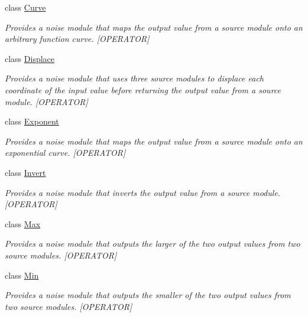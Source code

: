 \begin{DoxyCompactItemize}
class \hyperlink{class_lib_noise_1_1_operator_1_1_curve}{Curve}
\begin{DoxyCompactList}\small\item\em Provides a noise module that maps the output value from a source module onto an arbitrary function curve. \mbox{[}O\+P\+E\+R\+A\+T\+OR\mbox{]} \end{DoxyCompactList}\item 
class \hyperlink{class_lib_noise_1_1_operator_1_1_displace}{Displace}
\begin{DoxyCompactList}\small\item\em Provides a noise module that uses three source modules to displace each coordinate of the input value before returning the output value from a source module. \mbox{[}O\+P\+E\+R\+A\+T\+OR\mbox{]} \end{DoxyCompactList}\item 
class \hyperlink{class_lib_noise_1_1_operator_1_1_exponent}{Exponent}
\begin{DoxyCompactList}\small\item\em Provides a noise module that maps the output value from a source module onto an exponential curve. \mbox{[}O\+P\+E\+R\+A\+T\+OR\mbox{]} \end{DoxyCompactList}\item 
class \hyperlink{class_lib_noise_1_1_operator_1_1_invert}{Invert}
\begin{DoxyCompactList}\small\item\em Provides a noise module that inverts the output value from a source module. \mbox{[}O\+P\+E\+R\+A\+T\+OR\mbox{]} \end{DoxyCompactList}\item 
class \hyperlink{class_lib_noise_1_1_operator_1_1_max}{Max}
\begin{DoxyCompactList}\small\item\em Provides a noise module that outputs the larger of the two output values from two source modules. \mbox{[}O\+P\+E\+R\+A\+T\+OR\mbox{]} \end{DoxyCompactList}\item 
class \hyperlink{class_lib_noise_1_1_operator_1_1_min}{Min}
\begin{DoxyCompactList}\small\item\em Provides a noise module that outputs the smaller of the two output values from two source modules. \mbox{[}O\+P\+E\+R\+A\+T\+OR\mbox{]} \end{DoxyCompactList}\item 

\end{DoxyCompactItemize}
